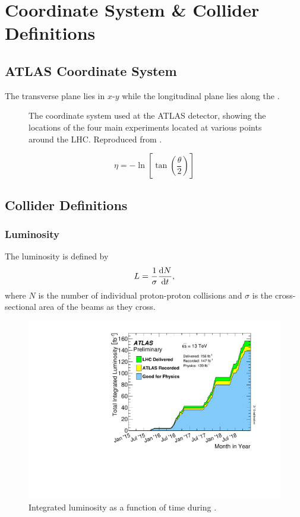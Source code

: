 \section{Coordinate System \& Collider Definitions}

\subsection{ATLAS Coordinate System}

The transverse plane lies in $x$\nobreakdash-$y$ while the longitudinal plane lies along the .
%
\begin{figure}[!htbp]
  \centering
  
  \caption{
    The coordinate system used at the ATLAS detector, showing the locations of the four main experiments located at various points around the LHC.
    Reproduced from .
  }
  \label{fig:atlas_coord_system}
\end{figure}

%
\begin{equation}\label{eq:pseudorap}
  \eta = - \ln \left[ \tan \left( \frac{\theta}{2} \right) \right]
\end{equation}
%




\subsection{Collider Definitions}

\subsubsection{Luminosity}
The luminosity is defined by
%
\begin{equation}\label{eq:lumi_def}
L = \frac{1}{\sigma} \frac{\mathrm{d}N}{\mathrm{d}t} ,
\end{equation}
%
where $N$ is the number of individual proton-proton collisions and $\sigma$ is the cross-sectional area of the beams as they cross.

%
\begin{figure}[!htbp]
  \centering
  \includegraphics[width=0.6\linewidth]{chapters/2.detector/figs/intlumivstimeRun2DQall.pdf}
  \caption{
    Integrated luminosity as a function of time during \runtwo \cite{atlas-lumi-run2}.
  }
  \label{fig:run2_lumi}
\end{figure}
%


